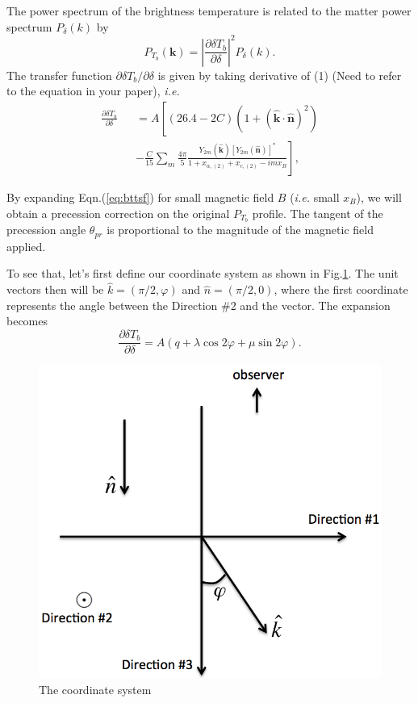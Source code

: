 \documentclass[aps,prd,twocolumn,floatfix,showpacs,superscriptaddress,nofootinbib]{revtex4-1}
\newcommand{\ie}{{\it i.e. }}
\begin{document}
The power spectrum of the brightness temperature is related to the matter power spectrum $P_\delta(k)$ by
\begin{equation}
P_{T_b}(\bm k)=\left\vert\frac{\partial\delta T_b}{\partial\delta}\right\vert^2 P_\delta(k).
\end{equation}
The transfer function $\partial\delta T_b/\partial\delta$ is given by taking derivative of (1){\color{red} (Need to refer to the equation in your paper)}, \ie
\begin{eqnarray}
\frac{\partial\delta T_b}{\partial\delta}&&=A\left[(26.4-2C)\left(1 + (\hat{\bm k} \cdot \hat{\bm n})^2\right)\right. \nonumber\\
&&\left.-\frac{C}{15}\sum_m \frac{4\pi}{5}\frac{Y_{2m}(\hat{\bm k})[Y_{2m}(\hat{\bm n})]^*}{1+x_{\alpha,(2)}+x_{c,(2)}-imx_B}\right],
\label{eq:bttsf}
\end{eqnarray}

By expanding Eqn.(\ref{eq:bttsf}) for small magnetic field $B$ (\ie small $x_B$), we will obtain a precession correction on the original $P_{T_b}$ profile. The tangent of the precession angle $\theta_{pr}$ is proportional to the magnitude of the magnetic field applied.

To see that, let's first define our coordinate system as shown in Fig.\ref{fig:coordinate}. The unit vectors then will be $\hat{k}=(\pi/2,\varphi)$ and $\hat{n}=(\pi/2,0)$, where the first coordinate represents the angle between the Direction \#2 and the vector. The expansion becomes
\begin{equation}
\frac{\partial\delta T_b}{\partial\delta}=A(q+\lambda\cos 2\varphi+\mu\sin 2\varphi).
\label{eq:Tbtsf_simplified}
\end{equation}
\begin{figure}
\includegraphics[scale=0.3]{coordinate.png}
\caption{The coordinate system}
\label{fig:coordinate}
\end{figure}
\end{document}
